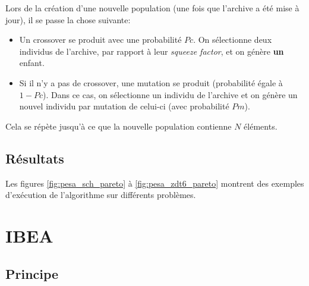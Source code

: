 \documentclass[12pt, letterpaper]{article}
\begin{document}
Lors de la création d'une nouvelle population (une fois que l'archive
a été mise à jour), il se passe la chose suivante:

\begin{itemize}

\item Un crossover se produit avec une probabilité $Pc$. On
  sélectionne deux individus de l'archive, par rapport à leur
  \textit{squeeze factor}, et on génère \textbf{un} enfant.\\

\item Si il n'y a pas de crossover, une mutation se produit
  (probabilité égale à $1 - Pc$). Dans ce cas, on sélectionne un
  individu de l'archive et on génère un nouvel individu par mutation
  de celui-ci (avec probabilité $Pm$).

\end{itemize}

Cela se répète jusqu'à ce que la nouvelle population contienne $N$
éléments.

\subsection{Résultats}
Les figures \ref{fig:pesa_sch_pareto} à \ref{fig:pesa_zdt6_pareto}
montrent des exemples d'exécution de l'algorithme sur différents
problèmes.

\section{IBEA}

\subsection{Principe}
\end{document}

